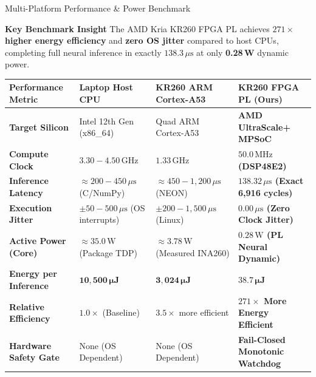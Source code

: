 \documentclass[aspectratio=169,10pt]{beamer}
\begin{document}
\begin{frame}{Multi-Platform Performance \& Power Benchmark}
    \begin{block}{\textbf{Key Benchmark Insight}}
        The AMD Kria KR260 FPGA PL achieves \textbf{$271\times$ higher energy efficiency} and \textbf{zero OS jitter} compared to host CPUs, completing full neural inference in exactly \textbf{$138.3\,\mu\text{s}$} at only \textbf{0.28\,W} dynamic power.
    \end{block}

    \vspace{0.2em}
    \centering
    \scriptsize
    \begin{tabularx}{\textwidth}{lXXX}
        \toprule
        \rowcolor{NavyBlue!15}
        \textbf{Performance Metric} & \textbf{Laptop Host CPU} & \textbf{KR260 ARM Cortex-A53} & \textbf{KR260 FPGA PL (Ours)} \\
        \midrule
        \textbf{Target Silicon} & Intel 12th Gen (x86\_64) & Quad ARM Cortex-A53 & \textbf{AMD UltraScale+ MPSoC} \\
        \textbf{Compute Clock} & $3.30 - 4.50\,\text{GHz}$ & $1.33\,\text{GHz}$ & \textbf{$50.0\,\text{MHz}$ (DSP48E2)} \\
        \textbf{Inference Latency} & $\approx 200 - 450\,\mu\text{s}$ (C/NumPy) & $\approx 450 - 1,200\,\mu\text{s}$ (NEON) & \textbf{$138.32\,\mu\text{s}$ (Exact 6,916 cycles)} \\
        \textbf{Execution Jitter} & $\pm 50 - 500\,\mu\text{s}$ (OS interrupts) & $\pm 200 - 1,500\,\mu\text{s}$ (Linux) & \textbf{$0.00\,\mu\text{s}$ (Zero Clock Jitter)} \\
        \textbf{Active Power (Core)} & $\approx 35.0\,\text{W}$ (Package TDP) & $\approx 3.78\,\text{W}$ (Measured INA260) & \textbf{$0.28\,\text{W}$ (PL Neural Dynamic)} \\
        \textbf{Energy per Inference} & $\mathbf{10,500\,\mu\text{J}}$ & $\mathbf{3,024\,\mu\text{J}}$ & $\mathbf{38.7\,\mu\text{J}}$ \\
        \rowcolor{SlateCyan!20}
        \textbf{Relative Efficiency} & $1.0\times$ (Baseline) & $3.5\times$ more efficient & \textbf{$271\times$ More Energy Efficient} \\
        \textbf{Hardware Safety Gate} & None (OS Dependent) & None (OS Dependent) & \textbf{Fail-Closed Monotonic Watchdog} \\
        \bottomrule
    \end{tabularx}
\end{frame}
\end{document}
